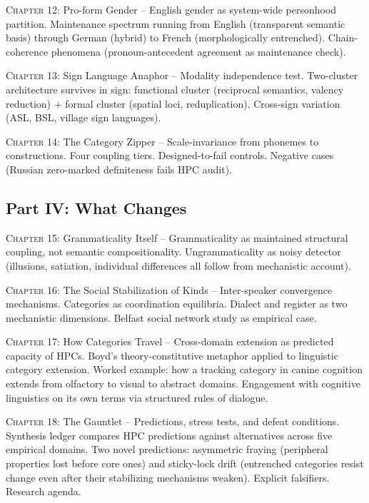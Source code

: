 \documentclass[11pt]{book}
\newcommand{\labelsc}[1]{{\mdseries\textsc{#1}}}
\begin{document}
\labelsc{Chapter 12:} Pro-form Gender -- English gender as system-wide personhood partition. Maintenance spectrum running from English (transparent semantic basis) through German (hybrid) to French (morphologically entrenched). Chain-coherence phenomena (pronoun-antecedent agreement as maintenance check).

\labelsc{Chapter 13:} Sign Language Anaphor -- Modality independence test. Two-cluster architecture survives in sign: functional cluster (reciprocal semantics, valency reduction) + formal cluster (spatial loci, reduplication). Cross-sign variation (ASL, BSL, village sign languages).

\labelsc{Chapter 14:} The Category Zipper -- Scale-invariance from phonemes to constructions. Four coupling tiers. Designed-to-fail controls. Negative cases (Russian zero-marked definiteness fails HPC audit).

\subsection*{Part IV: What Changes}

\labelsc{Chapter 15:} Grammaticality Itself -- Grammaticality as maintained structural coupling, not semantic compositionality. Ungrammaticality as noisy detector (illusions, satiation, individual differences all follow from mechanistic account).

\labelsc{Chapter 16:} The Social Stabilization of Kinds -- Inter-speaker convergence mechanisms. Categories as coordination equilibria. Dialect and register as two mechanistic dimensions. Belfast social network study as empirical case.

\labelsc{Chapter 17:} How Categories Travel -- Cross-domain extension as predicted capacity of HPCs. Boyd's theory-constitutive metaphor applied to linguistic category extension. Worked example: how a tracking category in canine cognition extends from olfactory to visual to abstract domains. Engagement with cognitive linguistics on its own terms via structured rules of dialogue.

\labelsc{Chapter 18:} The Gauntlet -- Predictions, stress tests, and defeat conditions. Synthesis ledger compares HPC predictions against alternatives across five empirical domains. Two novel predictions: asymmetric fraying (peripheral properties lost before core ones) and sticky-lock drift (entrenched categories resist change even after their stabilizing mechanisms weaken). Explicit falsifiers. Research agenda.
\end{document}
